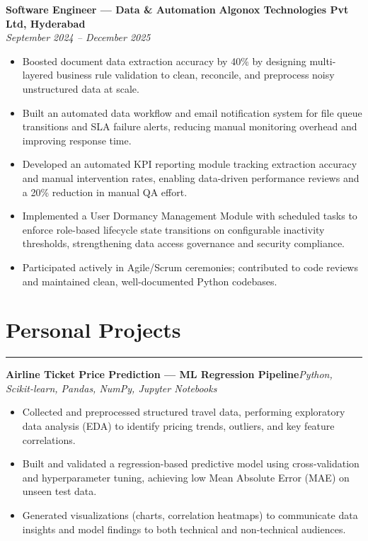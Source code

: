 \documentclass[12pt]{article}
\newenvironment{project}[2]
  {\par\textbf{#1}\hfill\textit{#2}\vspace{1pt}\begin{itemize}}
  {\end{itemize}\vspace{2pt}}
\begin{document}
\newpage
\textbf{Software Engineer --- Data \& Automation} \hfill \textbf{Algonox Technologies Pvt Ltd, Hyderabad} \\
\textit{September 2024 -- December 2025}
\begin{itemize}
  \item Boosted document data extraction accuracy by 40\% by designing multi-layered business rule validation to clean, reconcile, and preprocess noisy unstructured data at scale.
  \item Built an automated data workflow and email notification system for file queue transitions and SLA failure alerts, reducing manual monitoring overhead and improving response time.
  \item Developed an automated KPI reporting module tracking extraction accuracy and manual intervention rates, enabling data-driven performance reviews and a 20\% reduction in manual QA effort.
  \item Implemented a User Dormancy Management Module with scheduled tasks to enforce role-based lifecycle state transitions on configurable inactivity thresholds, strengthening data access governance and security compliance.
  \item Participated actively in Agile/Scrum ceremonies; contributed to code reviews and maintained clean, well-documented Python codebases.
\end{itemize}

\section*{Personal Projects}
\vspace{1pt}\hrule\vspace{4pt}

\begin{project}{Airline Ticket Price Prediction --- ML Regression Pipeline}{Python, Scikit-learn, Pandas, NumPy, Jupyter Notebooks}
  \item Collected and preprocessed structured travel data, performing exploratory data analysis (EDA) to identify pricing trends, outliers, and key feature correlations.
  \item Built and validated a regression-based predictive model using cross-validation and hyperparameter tuning, achieving low Mean Absolute Error (MAE) on unseen test data.
  \item Generated visualizations (charts, correlation heatmaps) to communicate data insights and model findings to both technical and non-technical audiences.
\end{project}
\end{document}
